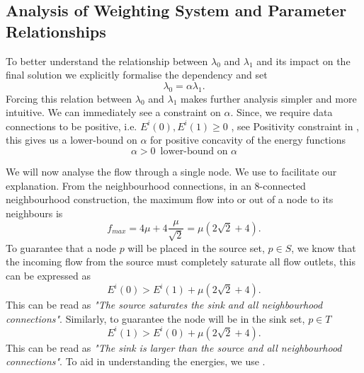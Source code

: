 \subsection{Analysis of Weighting System and Parameter Relationships}
\label{sec:cvgc_analysis}


To better understand the relationship between $\lambda_0$ and $\lambda_1$ and its impact on the final solution we explicitly formalise the dependency and set
\begin{equation}
	\lambda_0 = \alpha\lambda_1.
	\label{eq:l0l1dependancy}
\end{equation}
Forcing this relation between $\lambda_0$ and $\lambda_1$ makes further analysis simpler and more intuitive. We can immediately see a constraint on $\alpha$. Since, we require data connections to be positive, i.e. $E^i(0), E^i(1) \geq 0$ , see Positivity constraint  in , this gives us a lower-bound on $\alpha$ for positive concavity of the energy functions
\begin{equation}
	\alpha > 0 \,\text{ lower-bound on } \alpha
\end{equation}

We will now analyse the flow through a single node. We use   to facilitate our explanation. From the neighbourhood connections, in an 8-connected neighbourhood construction, the maximum flow into or out of a node to its neighbours is 
\begin{equation}
	f_{max} = 4\mu + 4\frac{\mu}{\sqrt{2}} = \mu \left( 2\sqrt{2} + 4\right).
	\label{eq:neighbourhoodsaturation}
\end{equation}
To guarantee that a node $p$ will be placed in the source set, $p \in S$, we know that the incoming flow from the source must completely saturate all flow outlets, this can be expressed as
\begin{equation}
	E^i(0) > E^i(1) + \mu \left( 2\sqrt{2} + 4\right).
	\label{eq:sourcesaturation}
\end{equation}
This can be read as \textit{"The source saturates the sink and all neighbourhood connections"}.
Similarly, to guarantee the node will be in the sink set, $p \in T$
\begin{equation}
E^i(1) > E^i(0) + \mu \left( 2\sqrt{2} + 4\right).
\end{equation}
This can be read as \textit{"The sink is larger than the source and all neighbourhood connections"}. To aid in understanding the energies, we use .

